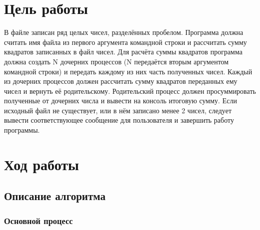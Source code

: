 \section{Цель работы}
В файле записан ряд целых чисел, разделённых пробелом. Программа должна считать имя файла из первого аргумента командной строки и рассчитать сумму квадратов записанных в файл чисел. Для расчёта суммы квадратов программа должна создать N дочерних процессов (N передаётся вторым аргументом командной строки) и передать каждому из них часть полученных чисел. Каждый из дочерних процессов должен рассчитать сумму квадратов переданных ему чисел и вернуть её родительскому. Родительский процесс должен просуммировать полученные от дочерних числа и вывести на консоль итоговую сумму. Если исходный файл не существует, или в нём записано менее 2 чисел, следует вывести соответствующее сообщение для пользователя и завершить работу программы. 


\section{Ход работы}

\subsection{Описание алгоритма}
\subsubsection{Основной процесс}

